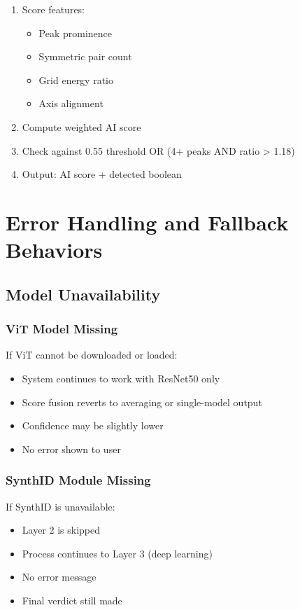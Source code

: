 \documentclass[12pt,a4paper]{book}
\begin{document}
\begin{itemize}
\begin{enumerate}
    \item Score features:
    \begin{itemize}
        \item Peak prominence
        \item Symmetric pair count
        \item Grid energy ratio
        \item Axis alignment
    \end{itemize}
    
    \item Compute weighted AI score
    
    \item Check against 0.55 threshold OR (4+ peaks AND ratio > 1.18)
    
    \item Output: AI score + detected boolean
\end{enumerate}

\chapter{Error Handling and Fallback Behaviors}
\label{ch:errors}

\section{Model Unavailability}

\subsection{ViT Model Missing}
If ViT cannot be downloaded or loaded:
\begin{itemize}
    \item System continues to work with ResNet50 only
    \item Score fusion reverts to averaging or single-model output
    \item Confidence may be slightly lower
    \item No error shown to user
\end{itemize}

\subsection{SynthID Module Missing}
If SynthID is unavailable:
\begin{itemize}
    \item Layer 2 is skipped
    \item Process continues to Layer 3 (deep learning)
    \item No error message
    \item Final verdict still made
\end{itemize}


\end{itemize}
\end{document}
